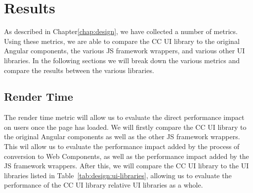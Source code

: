 \chapter{Results}\label{chap:results}
As described in Chapter\ref{chap:design}, we have collected a number of metrics. Using these metrics, we are able to compare the CC UI library to the original Angular components, the various JS framework wrappers, and various other UI libraries. In the following sections we will break down the various metrics and compare the results between the various libraries.

\section{Render Time}
The render time metric will allow us to evaluate the direct performance impact on users once the page has loaded. We will firstly compare the CC UI library to the original Angular components as well as the other JS framework wrappers. This wil allow us to evaluate the performance impact added by the process of conversion to Web Components, as well as the performance impact added by the JS framework wrappers. After this, we will compare the CC UI library to the UI libraries listed in Table~\ref{tab:design:ui-libraries}, allowing us to evaluate the performance of the CC UI library relative UI libraries as a whole.

